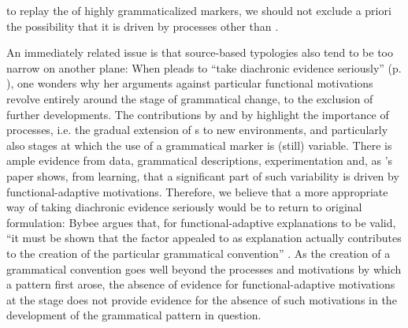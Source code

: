 \documentclass[output=paper]{langsci/langscibook}
\begin{document}
to replay the  of highly grammaticalized markers, we should not exclude a priori the possibility that it is driven by processes other than . 

An immediately related issue is that source-based typologies also tend to be too narrow on another plane: When  pleads to “take diachronic evidence seriously” (p. \pageref{p:cristofaro:evidenceseriously}), one wonders why her arguments against particular functional motivations revolve entirely around the  stage of grammatical change, to the exclusion of further developments. The contributions by  and by  highlight the importance of  processes, i.e. the gradual extension of s to new environments, and particularly also stages at which the use of a grammatical marker is (still) variable. There is ample evidence from  data, grammatical descriptions,  experimentation and, as ’s paper shows, from  learning, that a significant part of such variability is driven by functional-adaptive motivations. Therefore, we believe that a more appropriate way of taking diachronic evidence seriously would be to return to  original formulation: Bybee argues that, for functional-adaptive explanations to be valid, “it must be shown that the factor appealed to as explanation actually contributes to the creation of the particular grammatical convention” \citep[357]{Bybee1988}. As the creation of a grammatical convention goes well beyond the processes and motivations by which a pattern first arose, the absence of evidence for functional-adaptive motivations at the  stage does not provide evidence for the absence of such motivations in the development of the grammatical pattern in question.
\end{document}
